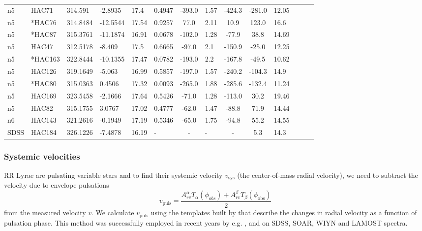 \documentclass[useAMS,usenatbib]{mn2e}
\begin{document}
\begin{table*}
\begin{minipage}{150mm}
\begin{tabular}{@{}llllllclccllll@{}}
n5 & HAC71 & 314.591 & -2.8935 & 17.4 & 0.4947 & -393.0 & 1.57 & -424.3 & -281.0 & 12.05 \\
n5 & *HAC76 & 314.8484 & -12.5544 & 17.54 & 0.9257 & 77.0 & 2.11 & 10.9 & 123.0 & 16.6 \\
n5 & *HAC87 & 315.3761 & -11.1874 & 16.91 & 0.0678 & -102.0 & 1.28 & -77.9 & 38.8 & 14.69 \\
n5 & HAC47 & 312.5178 & -8.409 & 17.5 & 0.6665 & -97.0 & 2.1 & -150.9 & -25.0 & 12.25 \\
n5 & *HAC163 & 322.8444 & -10.1355 & 17.47 & 0.0782 & -193.0 & 2.2 & -167.8 & -49.5 & 10.62 \\
n5 & HAC126 & 319.1649 & -5.063 & 16.99 & 0.5857 & -197.0 & 1.57 & -240.2 & -104.3 & 14.9 \\
n5 & *HAC80 & 315.0363 & 0.4506 & 17.32 & 0.0093 & -265.0 & 1.88 & -285.6 & -132.4 & 11.24 \\
n5 & HAC169 & 323.5458 & -2.1666 & 17.64 & 0.5426 & -71.0 & 1.28 & -113.0 & 30.2 & 19.46 \\
n5 & HAC82 & 315.1755 & 3.0767 & 17.02 & 0.4777 & -62.0 & 1.47 & -88.8 & 71.9 & 14.44 \\
n6 & HAC143 & 321.2616 & -0.1949 & 17.19 & 0.5346 & -65.0 & 1.75 & -94.8 & 55.2 & 14.55 \\
SDSS & HAC184 & 326.1226 & -7.4878 & 16.19 & - & -& - & - & 5.3 & 14.3 \\
\hline
    \end{tabular}
 \end{minipage}
\end{table*}


\subsubsection{Systemic velocities}
RR Lyrae are pulsating variable stars and to find their systemic velocity $v_{\mathrm{sys}}$ (the center-of-mass radial velocity), we need to subtract the velocity due to envelope pulsations 
\begin{equation}
v_{\mathrm{puls} }= \frac{A_{rv}^{\alpha}T_{\alpha}(\phi_{obs}) + A_{rv}^{\beta}T_{\beta}(\phi_{\mathrm{obs}})}{2} 
\end{equation} 
from the measured velocity $v$. We calculate $v_{\mathrm{puls} }$ using the templates built by \citet{Se12} that describe the changes in radial velocity as a function of pulsation phase. This method  was successfully employed in recent years by e.g. \citet{Drake2013a}, \citet{Vivas2016} and \citet{Ablimit2017} on SDSS, SOAR, WIYN and LAMOST spectra.
\end{document}
